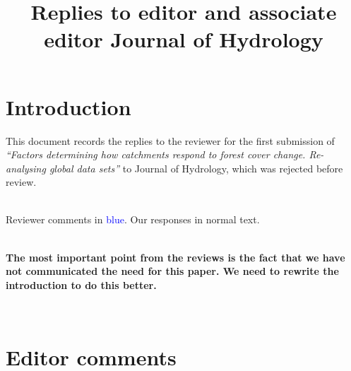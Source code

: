 \documentclass[]{elsarticle} %
\begin{document}
\begin{frontmatter}

  \title{Replies to editor and associate editor Journal of Hydrology}
    \author[]{}
  
      
  \begin{abstract}
  
  \end{abstract}
  
 \end{frontmatter}

\hypertarget{introduction}{%
\section{Introduction}\label{introduction}}

This document records the replies to the reviewer for the first submission of \emph{``Factors determining how catchments respond to forest cover change. Re-analysing global data sets''} to Journal of Hydrology, which was rejected before review.\\
\strut \\
Reviewer comments in \textcolor{blue}{blue}. Our responses in normal text.\\
\strut \\
\textbf{The most important point from the reviews is the fact that we have not communicated the need for this paper. We need to rewrite the introduction to do this better.}\\
\strut \\

\hypertarget{editor-comments}{%
\section{Editor comments}\label{editor-comments}}
\end{document}
